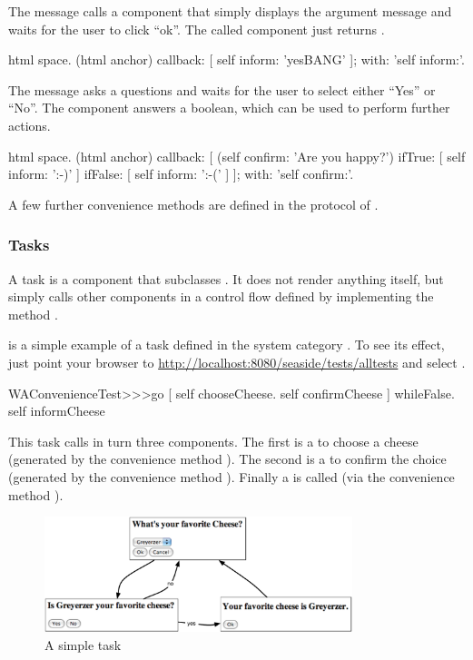 \documentclass[a4paper,10pt,twoside]{book}
\begin{document}
The message  calls a component that simply displays the argument message and waits for the user to click ``ok''.
The called component just returns .

\begin{code}{}
html space.
(html anchor)
	callback: [ self inform: 'yesBANG' ];
	with: 'self inform:'.
\end{code}

The message  asks a questions and waits for the user to select either ``Yes'' or ``No''.
The component answers a boolean, which can be used to perform further actions.

\begin{code}{}
html space.
(html anchor)
	callback: [
			(self confirm: 'Are you happy?')
				ifTrue: [ self inform: ':-)' ]
				ifFalse: [ self inform: ':-(' ]
			];
	with: 'self confirm:'.
\end{code}

A few further convenience methods are defined in the  protocol of .

\subsubsection{Tasks}

A task is a component that subclasses .
It does not render anything itself, but simply calls other components in a control flow defined by implementing the method .

 is a simple example of a task defined in the system category .
To see its effect, just point your browser to \url{http://localhost:8080/seaside/tests/alltests} and select .

\begin{code}{}
WAConvenienceTest>>>go
	[ self chooseCheese.
	  self confirmCheese ] whileFalse.
	self informCheese
\end{code}

This task calls in turn three components.
The first is a  to choose a cheese (generated by the convenience method ).
The second is a  to confirm the choice (generated by the convenience method ).
Finally a  is called (via the convenience method ).

\begin{figure}[ht]
\begin{center}
\includegraphics[width=0.8\textwidth]{chooseCheese}
\caption{A simple task}
\label{fig:chooseCheese}
\end{center}
\end{figure}
\end{document}
